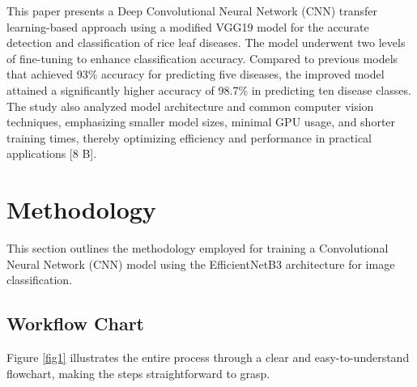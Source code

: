 \documentclass[conference]{IEEEtran}
\begin{document}
This paper presents a Deep Convolutional Neural Network (CNN) transfer learning-based approach using a modified VGG19 model for the accurate detection and classification of rice leaf diseases. The model underwent two levels of fine-tuning to enhance classification accuracy. Compared to previous models that achieved 93\% accuracy for predicting five diseases, the improved model attained a significantly higher accuracy of 98.7\% in predicting ten disease classes. The study also analyzed model architecture and common computer vision techniques, emphasizing smaller model sizes, minimal GPU usage, and shorter training times, thereby optimizing efficiency and performance in practical applications [8 B].


\section{Methodology}
This section outlines the methodology employed for training a Convolutional Neural Network (CNN) model using the EfficientNetB3 architecture for image classification.

\subsection{Workflow Chart}
Figure \ref{fig1} illustrates the entire process through a clear and easy-to-understand flowchart, making the steps straightforward to grasp.
\end{document}
